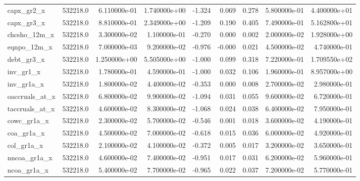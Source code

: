 \documentclass[12pt]{article}
\begin{document}
{\begin{landscape}
\begin{longtable}{|l|r|r|r|r|r|r|r|r|}
capx\_gr2\_x             &  532218.0 &  6.110000e-01 &  1.740000e+00 &      -1.324 &        0.069 &        0.278 &  5.800000e-01 &  4.400000e+01 \\
capx\_gr3\_x             &  532218.0 &  8.810000e-01 &  2.349000e+00 &      -1.209 &        0.190 &        0.405 &  7.490000e-01 &  5.162800e+01 \\
chcsho\_12m\_x           &  532218.0 &  3.300000e-02 &  1.100000e-01 &      -0.270 &        0.000 &        0.002 &  2.000000e-02 &  1.928000e+00 \\
eqnpo\_12m\_x            &  532218.0 &  7.000000e-03 &  9.200000e-02 &      -0.976 &       -0.000 &        0.021 &  4.500000e-02 &  4.740000e-01 \\
debt\_gr3\_x             &  532218.0 &  1.250000e+00 &  5.505000e+00 &      -1.000 &        0.099 &        0.318 &  7.220000e-01 &  1.709550e+02 \\
inv\_gr1\_x              &  532218.0 &  1.780000e-01 &  4.590000e-01 &      -1.000 &        0.032 &        0.106 &  1.960000e-01 &  8.957000e+00 \\
inv\_gr1a\_x             &  532218.0 &  1.800000e-02 &  4.400000e-02 &      -0.353 &        0.000 &        0.008 &  2.700000e-02 &  2.980000e-01 \\
oaccruals\_at\_x         &  532218.0 &  6.800000e-02 &  9.900000e-02 &      -1.094 &        0.031 &        0.055 &  9.600000e-02 &  6.720000e-01 \\
taccruals\_at\_x         &  532218.0 &  4.600000e-02 &  8.300000e-02 &      -1.068 &        0.024 &        0.038 &  6.400000e-02 &  7.950000e-01 \\
cowc\_gr1a\_x            &  532218.0 &  2.300000e-02 &  5.700000e-02 &      -0.546 &        0.001 &        0.018 &  3.600000e-02 &  4.190000e-01 \\
coa\_gr1a\_x             &  532218.0 &  4.500000e-02 &  7.000000e-02 &      -0.618 &        0.015 &        0.036 &  6.000000e-02 &  4.920000e-01 \\
col\_gr1a\_x             &  532218.0 &  2.100000e-02 &  4.100000e-02 &      -0.372 &        0.005 &        0.017 &  3.200000e-02 &  3.650000e-01 \\
nncoa\_gr1a\_x           &  532218.0 &  4.600000e-02 &  7.400000e-02 &      -0.951 &        0.017 &        0.031 &  6.200000e-02 &  5.960000e-01 \\
ncoa\_gr1a\_x            &  532218.0 &  5.400000e-02 &  7.700000e-02 &      -0.965 &        0.022 &        0.037 &  7.200000e-02 &  5.770000e-01 \\

\end{longtable}
\end{landscape}}
\end{document}
